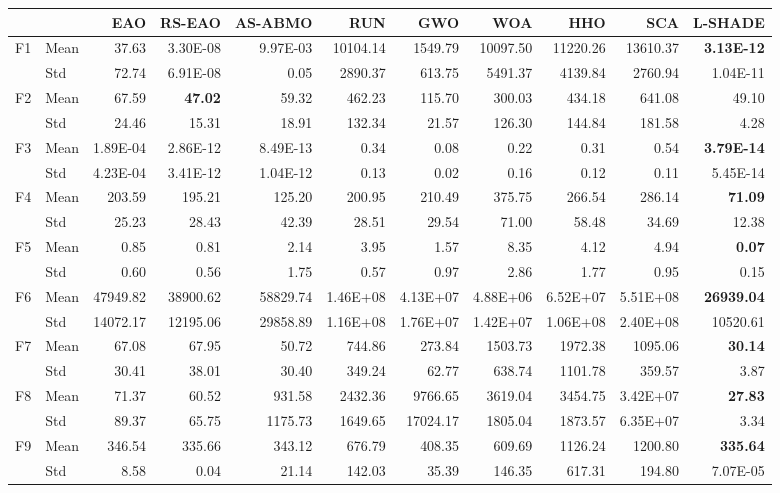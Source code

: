\begin{tabular}{@{}llrrrrrrrrr@{}}
\toprule
 & & EAO & RS-EAO & AS-ABMO & RUN & GWO & WOA & HHO & SCA & L-SHADE \\
\midrule
F1 & Mean & 37.63 & 3.30E-08 & 9.97E-03 & 10104.14 & 1549.79 & 10097.50 & 11220.26 & 13610.37 & \textbf{3.13E-12} \\
 & Std & 72.74 & 6.91E-08 & 0.05 & 2890.37 & 613.75 & 5491.37 & 4139.84 & 2760.94 & 1.04E-11 \\
F2 & Mean & 67.59 & \textbf{47.02} & 59.32 & 462.23 & 115.70 & 300.03 & 434.18 & 641.08 & 49.10 \\
 & Std & 24.46 & 15.31 & 18.91 & 132.34 & 21.57 & 126.30 & 144.84 & 181.58 & 4.28 \\
F3 & Mean & 1.89E-04 & 2.86E-12 & 8.49E-13 & 0.34 & 0.08 & 0.22 & 0.31 & 0.54 & \textbf{3.79E-14} \\
 & Std & 4.23E-04 & 3.41E-12 & 1.04E-12 & 0.13 & 0.02 & 0.16 & 0.12 & 0.11 & 5.45E-14 \\
F4 & Mean & 203.59 & 195.21 & 125.20 & 200.95 & 210.49 & 375.75 & 266.54 & 286.14 & \textbf{71.09} \\
 & Std & 25.23 & 28.43 & 42.39 & 28.51 & 29.54 & 71.00 & 58.48 & 34.69 & 12.38 \\
F5 & Mean & 0.85 & 0.81 & 2.14 & 3.95 & 1.57 & 8.35 & 4.12 & 4.94 & \textbf{0.07} \\
 & Std & 0.60 & 0.56 & 1.75 & 0.57 & 0.97 & 2.86 & 1.77 & 0.95 & 0.15 \\
F6 & Mean & 47949.82 & 38900.62 & 58829.74 & 1.46E+08 & 4.13E+07 & 4.88E+06 & 6.52E+07 & 5.51E+08 & \textbf{26939.04} \\
 & Std & 14072.17 & 12195.06 & 29858.89 & 1.16E+08 & 1.76E+07 & 1.42E+07 & 1.06E+08 & 2.40E+08 & 10520.61 \\
F7 & Mean & 67.08 & 67.95 & 50.72 & 744.86 & 273.84 & 1503.73 & 1972.38 & 1095.06 & \textbf{30.14} \\
 & Std & 30.41 & 38.01 & 30.40 & 349.24 & 62.77 & 638.74 & 1101.78 & 359.57 & 3.87 \\
F8 & Mean & 71.37 & 60.52 & 931.58 & 2432.36 & 9766.65 & 3619.04 & 3454.75 & 3.42E+07 & \textbf{27.83} \\
 & Std & 89.37 & 65.75 & 1175.73 & 1649.65 & 17024.17 & 1805.04 & 1873.57 & 6.35E+07 & 3.34 \\
F9 & Mean & 346.54 & 335.66 & 343.12 & 676.79 & 408.35 & 609.69 & 1126.24 & 1200.80 & \textbf{335.64} \\
 & Std & 8.58 & 0.04 & 21.14 & 142.03 & 35.39 & 146.35 & 617.31 & 194.80 & 7.07E-05 \\

\end{tabular}
